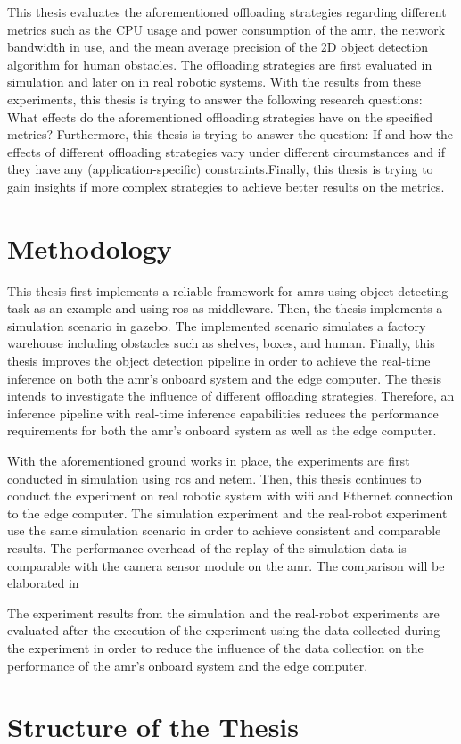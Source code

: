 This thesis evaluates the aforementioned offloading strategies regarding different metrics such as the CPU usage and power consumption of the \gls{amr}, the network bandwidth in use, and the mean average precision of the 2D object detection algorithm for human obstacles. The offloading strategies are first evaluated in simulation and later on in real robotic systems. With the results from these experiments, this thesis is trying to answer the following research questions: What effects do the aforementioned offloading strategies have on the specified metrics? Furthermore, this thesis is trying to answer the question: If and how the effects of different offloading strategies vary under different circumstances and if they have any (application-specific) constraints.Finally, this thesis is trying to gain insights if more complex strategies to achieve better results on the metrics. 

\section{Methodology}

This thesis first implements a reliable framework for \glspl{amr} using object detecting task as an example and using \gls{ros} as middleware. Then, the thesis implements a simulation scenario in \gls{gazebo}. The implemented scenario simulates a factory warehouse including obstacles such as shelves, boxes, and human. Finally, this thesis improves the object detection pipeline in order to achieve the real-time inference on both the \gls{amr}'s onboard system and the edge computer. The thesis intends to investigate the influence of different offloading strategies. Therefore, an inference pipeline with real-time inference capabilities reduces the performance requirements for both the \gls{amr}'s onboard system as well as the edge computer.

With the aforementioned ground works in place, the experiments are first conducted in simulation using \gls{ros} and \gls{netem}. Then, this thesis continues to conduct the experiment on real robotic system with \gls{wifi} and Ethernet connection to the edge computer. The simulation experiment and the real-robot experiment use the same simulation scenario in order to achieve consistent and comparable results. The performance overhead of the replay of the simulation data is comparable with the camera sensor module on the \gls{amr}. The comparison will be elaborated in 

The experiment results from the simulation and the real-robot experiments are evaluated after the execution of the experiment using the data collected during the experiment in order to reduce the influence of the data collection on the performance of the \gls{amr}'s onboard system and the edge computer.

\section{Structure of the Thesis}